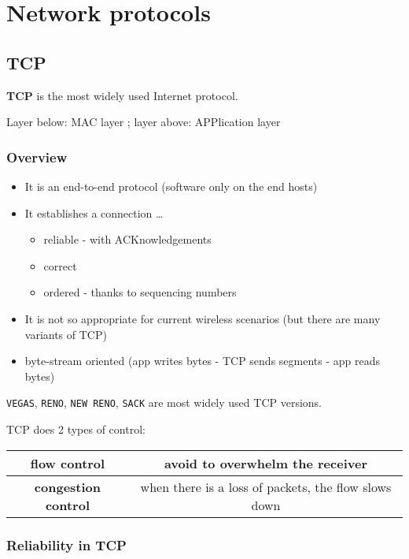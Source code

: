 \part{Network protocols}
\chapter{TCP}

\textbf{TCP} is the most widely used Internet protocol.

Layer below: MAC layer ; layer above: APPlication layer

\section{Overview}

\begin{itemize}
  \item It is an end-to-end protocol (software only on the end hosts)
  \item It establishes a connection \dots
  \begin{itemize}
    \item reliable - with ACKnowledgements
    \item correct
    \item ordered - thanks to sequencing numbers
  \end{itemize}
  \item It is not so appropriate for current wireless scenarios (but there are
many variants of TCP)
  \item byte-stream oriented (app writes bytes - TCP sends segments - app
reads bytes)
\end{itemize}

\texttt{VEGAS}, \texttt{RENO}, \texttt{NEW RENO}, \texttt{SACK} are most
widely used TCP versions.

TCP does 2 types of control:

\begin{table}[h!]
  \begin{tabular}{c c}
  \hline
  \textbf{flow control} & avoid to overwhelm the receiver \\
  \hline
  \textbf{congestion control} & when there is a loss of packets, the flow
slows down \\
  \hline
  \end{tabular}
\end{table}

\section{Reliability in TCP}

